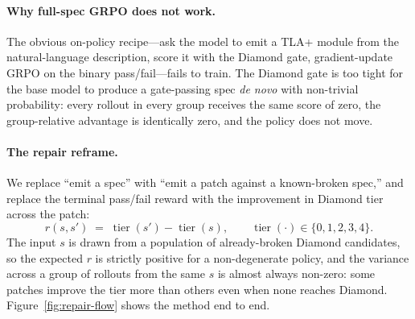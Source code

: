 \documentclass[11pt]{article}
\begin{document}
\paragraph{Why full-spec GRPO does not work.} The obvious on-policy
recipe---ask the model to emit a TLA+ module from the
natural-language description, score it with the Diamond gate,
gradient-update GRPO on the binary pass/fail---fails to train. The
Diamond gate is too tight for the base model to produce a gate-passing
spec \emph{de novo} with non-trivial probability: every rollout in
every group receives the same score of zero, the group-relative
advantage is identically zero, and the policy does not move.

\paragraph{The repair reframe.} We replace ``emit a spec'' with
``emit a patch against a known-broken spec,'' and replace the
terminal pass/fail reward with the improvement in Diamond tier
across the patch:
\[
  r(s, s') \;=\; \operatorname{tier}(s') - \operatorname{tier}(s),
  \qquad \operatorname{tier}(\cdot) \in \{0, 1, 2, 3, 4\}.
\]
The input $s$ is drawn from a population of already-broken Diamond
candidates, so the expected $r$ is strictly positive for a non-degenerate
policy, and the variance across a group of rollouts from the same $s$
is almost always non-zero: some patches improve the tier more than
others even when none reaches Diamond.
Figure~\ref{fig:repair-flow} shows the method end to end.
\end{document}
